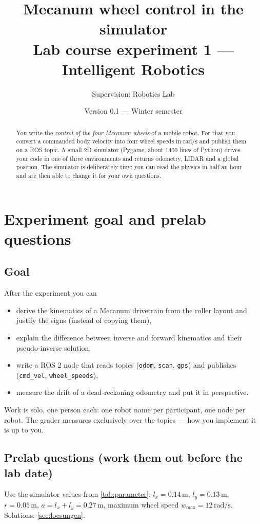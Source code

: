 \documentclass[12pt,a4paper]{scrartcl}
\title{\textbf{Mecanum wheel control in the simulator}\\[2pt]
  \large Lab course experiment 1 — Intelligent Robotics}
\author{Supervision: Robotics Lab}
\date{Version 0.1 — Winter semester}
\newcommand{\thema}[1]{\texttt{#1}}
\begin{document}
\maketitle

\begin{abstract}
\noindent
You write the \emph{control of the four Mecanum wheels} of a mobile robot. For that you
convert a commanded body velocity into four wheel speeds in \(\mathrm{rad/s}\) and
publish them on a ROS topic. A small 2D simulator (Pygame, about 1400 lines of Python)
drives your code in one of three environments and returns odometry, LIDAR and a global
position. The simulator is deliberately tiny: you can read the physics in half an hour
and are then able to change it for your own
questions.
\end{abstract}

\tableofcontents

\section{Experiment goal and prelab questions}

\subsection{Goal}
After the experiment you can
\begin{itemize}
  \item derive the kinematics of a Mecanum drivetrain from the roller layout and
        justify the signs (instead of copying them),
  \item explain the difference between inverse and forward kinematics and their
        pseudo-inverse solution,
  \item write a ROS 2 node that reads topics (\thema{odom}, \thema{scan},
        \thema{gps}) and publishes (\thema{cmd\_vel}, \thema{wheel\_speeds}),
  \item measure the drift of a dead-reckoning odometry and put it in perspective.
\end{itemize}
Work is solo, one person each: one robot name per participant, one node per
robot. The grader measures exclusively over the topics — how you implement it
is up to you.

\subsection{Prelab questions (work them out before the lab date)}
Use the simulator values from \cref{tab:parameter}:
\(l_x = 0.14\,\mathrm{m}\), \(l_y = 0.13\,\mathrm{m}\), \(r = 0.05\,\mathrm{m}\),
\(a = l_x + l_y = 0.27\,\mathrm{m}\), maximum wheel speed
\(w_{\max} = 12\,\mathrm{rad/s}\). Solutions: \cref{sec:loesungen}.
\end{document}
